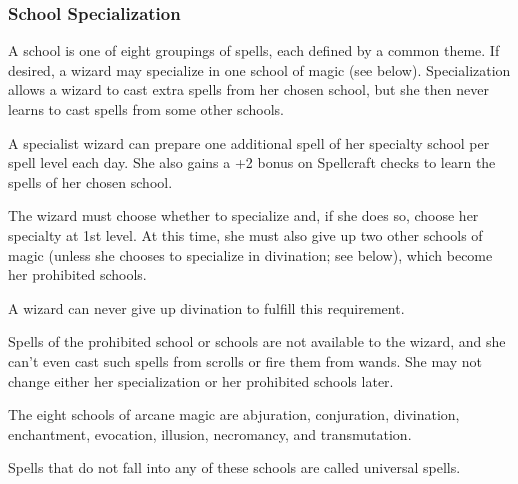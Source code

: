 \subsubsection{School Specialization}

A school is one of eight groupings of spells, each defined by a common theme. If desired, a wizard may specialize in one school of magic (see below). Specialization allows a wizard to cast extra spells from her chosen school, but she then never learns to cast spells from some other schools.

A specialist wizard can prepare one additional spell of her specialty school per spell level each day. She also gains a +2 bonus on Spellcraft checks to learn the spells of her chosen school.

The wizard must choose whether to specialize and, if she does so, choose her specialty at 1st level. At this time, she must also give up two other schools of magic (unless she chooses to specialize in divination; see below), which become her prohibited schools.

A wizard can never give up divination to fulfill this requirement.

Spells of the prohibited school or schools are not available to the wizard, and she can't even cast such spells from scrolls or fire them from wands. She may not change either her specialization or her prohibited schools later.

The eight schools of arcane magic are abjuration, conjuration, divination, enchantment, evocation, illusion, necromancy, and transmutation.

Spells that do not fall into any of these schools are called universal spells.

